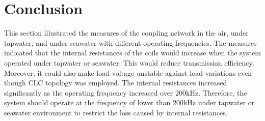 \section{Conclusion}

This section illustrated the measures of the coupling network in the air, under tapwater, and under seawater with different operating frequencies.
The measures indicated that the internal resistances of the coils would increase when the system operated under tapwater or seawater.
This would reduce transmission efficiency.
Moreover, it could also make load voltage unstable against load variations even though CLC topology was employed.
The internal resistances increased significantly as the operating frequency increased over $200\si{\kilo\hertz}$.
Therefore, the system should operate at the frequency of lower than $200\si{\kilo\hertz}$ under tapwater or seawater environment to restrict the loss caused by internal resistances.




